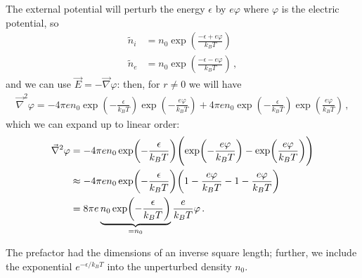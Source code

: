 \documentclass[main.tex]{subfiles}
\begin{document}
The external potential will perturb the energy \(\epsilon \) by \(e \varphi \) where \(\varphi \) is the electric potential, so 
%
\begin{subequations}
\begin{align}
\widetilde{n}_i &= n_0 \exp(\frac{- \epsilon + e \varphi }{k_B T})  \\
\widetilde{n}_e &= n_0 \exp(\frac{- \epsilon - e \varphi }{k_B T})
\,,
\end{align}
\end{subequations}
%
and we can use \(\vec{E} = - \vec{\nabla} \varphi \): then, for \(r \neq 0\) we will have
%
\begin{align}
\vec{\nabla}^2 \varphi = 
- 4 \pi e n_0 \exp(- \frac{\epsilon }{k_B T}) 
\exp( - \frac{e \varphi }{k_B T})
+ 4 \pi e n_0 \exp(- \frac{\epsilon }{k_B T}) \exp( \frac{e \varphi }{k_B T})
\,,
\end{align}
%
which we can expand up to linear order: 
%
\begin{subequations}
\begin{align}
\vec{\nabla}^2 \varphi &= 
- 4 \pi e n_0 \exp(- \frac{\epsilon }{k_B T}) 
\qty( \exp(- \frac{e \varphi }{k_B T}) - \exp(\frac{e \varphi }{k_B T}))  \\
&\approx 
- 4 \pi e n_0 \exp(- \frac{\epsilon }{k_B T}) 
\qty(1 - \frac{e \varphi }{k_BT} - 1 - \frac{e \varphi }{k_B T})  \\
&=
8 \pi e \underbrace{n_0 \exp(- \frac{\epsilon }{k_B T})}_{ = n_0 } 
\frac{e }{k_B T} \varphi
\,.
\end{align}
\end{subequations}

The prefactor had the dimensions of an inverse square length; further, we include the exponential \(e^{- \epsilon / k_BT}\) into the unperturbed density \(n_0 \).
\end{document}
